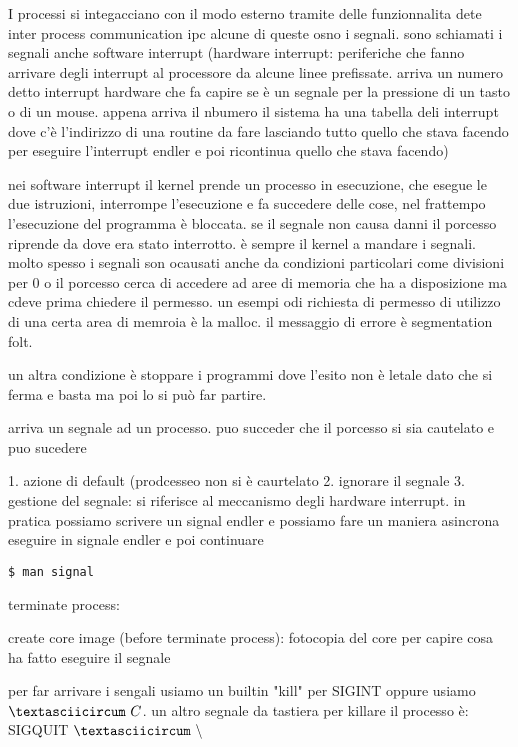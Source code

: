 I processi si integacciano con il modo esterno tramite delle funzionnalita dete inter process communication ipc alcune di queste osno i segnali. sono schiamati i segnali anche software interrupt (hardware interrupt: periferiche che fanno arrivare degli interrupt al processore da alcune linee prefissate. arriva un numero detto interrupt hardware che fa capire se è un segnale per la pressione di un tasto o di un mouse. appena arriva il nbumero il sistema ha una tabella deli interrupt dove c'è l'indirizzo di una routine da fare lasciando tutto quello che stava facendo per eseguire l'interrupt endler e poi ricontinua quello che stava facendo)


nei software interrupt il kernel prende un processo in esecuzione, che esegue le due istruzioni, interrompe l'esecuzione e fa succedere delle cose, nel frattempo l'esecuzione del programma è bloccata. se il segnale non causa danni il porcesso riprende da dove era stato interrotto. è sempre il kernel a mandare i segnali. molto spesso i segnali son ocausati anche da condizioni particolari come divisioni per 0 o il porcesso cerca di accedere ad aree di memoria che ha a disposizione ma cdeve prima chiedere il permesso. un esempi odi richiesta di permesso di utilizzo di una certa area di memroia è la malloc. il messaggio di errore è segmentation folt.

un altra condizione è stoppare i programmi dove l'esito non è letale dato che si ferma e basta ma poi lo si può far partire.

arriva un segnale ad un processo. puo succeder che il porcesso si sia cautelato e puo sucedere

1. azione di default (prodcesseo non si è caurtelato
2. ignorare il segnale
3. gestione del segnale: si riferisce al meccanismo degli hardware interrupt. in pratica possiamo scrivere un signal endler e possiamo fare un maniera asincrona eseguire in signale endler e poi continuare

\begin{lstlisting}
$ man signal
\end{lstlisting}


terminate process: 

create core image (before terminate process): fotocopia del core per capire cosa ha fatto eseguire il segnale


per far arrivare i sengali usiamo un builtin "kill" per SIGINT oppure usiamo $\textasciicircum\ C$. un altro segnale da tastiera per killare il processo è: SIGQUIT $ \textasciicircum\ \backslash $



